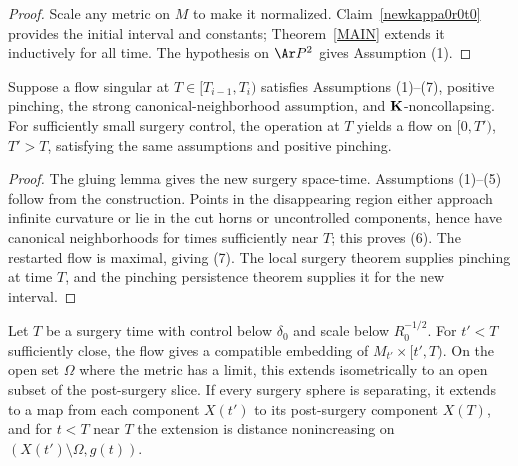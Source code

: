 \begin{proof}
\sketch
{}
Scale any metric on $M$ to make it normalized. Claim~\ref{newkappa0r0t0}
provides the initial interval and constants; Theorem~\ref{MAIN} extends it
inductively for all time. The hypothesis on $\Ar P^2$ gives Assumption (1).
\end{proof}

\begin{lemma}
\label{lem:surgery-preserves-assumptions-pinching}
\label{14.26}
Suppose a flow singular at $T\in[T_{i-1},T_i)$ satisfies Assumptions (1)--(7),
positive pinching, the strong canonical-neighborhood assumption, and
${\bf K}$-noncollapsing. For sufficiently small surgery control, the operation
at $T$ yields a flow on $[0,T')$, $T'>T$, satisfying the same assumptions and
positive pinching.
\end{lemma}

\begin{proof}
\sketch
{}
The gluing lemma gives the new surgery space-time. Assumptions (1)--(5) follow
from the construction. Points in the disappearing region either approach
infinite curvature or lie in the cut horns or uncontrolled components, hence
have canonical neighborhoods for times sufficiently near $T$; this proves (6).
The restarted flow is maximal, giving (7). The local surgery theorem supplies
pinching at time $T$, and the pinching persistence theorem supplies it for the
new interval.
\end{proof}

\begin{proposition}
\label{prop:surgery-distance-decreasing}
\label{surgerydist}
Let $T$ be a surgery time with control below $\delta_0$ and scale below
$R_0^{-1/2}$. For $t'<T$ sufficiently close, the flow gives a compatible
embedding of $M_{t'}\times[t',T)$. On the open set $\Omega$ where the metric
has a limit, this extends isometrically to an open subset of the post-surgery
slice. If every surgery sphere is separating, it extends to a map from each
component $X(t')$ to its post-surgery component $X(T)$, and for $t<T$ near $T$
the extension is distance nonincreasing on
$(X(t')\setminus\Omega,g(t))$.
\end{proposition}

